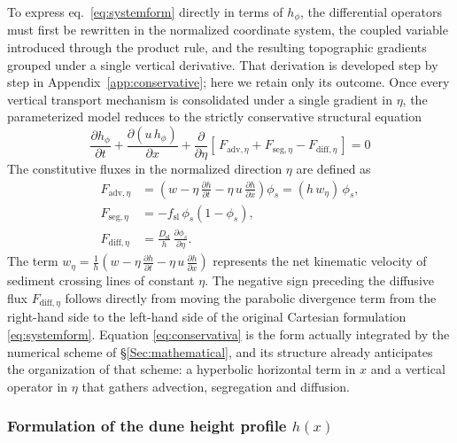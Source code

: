 \documentclass[lineno]{JFM-FLM_Au}
\begin{document}
To express eq.~\eqref{eq:systemform} directly in terms of $h_\phi$, the differential operators must first be rewritten in the normalized coordinate system, the coupled variable introduced through the product rule, and the resulting topographic gradients grouped under a single vertical derivative. That derivation is developed step by step in Appendix~\ref{app:conservative}; here we retain only its outcome. Once every vertical transport mechanism is consolidated under a single gradient in $\eta$, the parameterized model reduces to the strictly conservative structural equation
\begin{equation}
    {\;\frac{\partial h_{\phi}}{\partial t} + \frac{\partial (u \,h_{\phi})}{\partial x} + \frac{\partial}{\partial \eta}\!\left[\, F_{\mathrm{adv},\eta} + F_{\mathrm{seg},\eta} - F_{\mathrm{diff},\eta} \,\right] = 0\;}
    \label{eq:conservativa}
\end{equation}
The constitutive fluxes in the normalized direction $\eta$ are defined as
\begin{align}
    F_{\mathrm{adv},\eta} &= \left( w - \eta \,\frac{\partial h}{\partial t} - \eta \,u \,\frac{\partial h}{\partial x} \right) \!\phi_s = (h \,w_{\eta}) \,\phi_s, \label{eq:Fadv} \\
    F_{\mathrm{seg},\eta} &= -f_{\mathrm{sl}} \,\phi_s (1 - \phi_s), \label{eq:Fseg} \\
    F_{\mathrm{diff},\eta} &= \frac{D_{\mathrm{sl}}}{h} \,\frac{\partial \phi_s}{\partial \eta}. \label{eq:Fdiff}
\end{align}
The term $w_\eta = \frac{1}{h}\left(w - \eta\,\frac{\partial h}{\partial t} - \eta\,u\,\frac{\partial h}{\partial x}\right)$ represents the net kinematic velocity of sediment crossing lines of constant $\eta$. The negative sign preceding the diffusive flux $F_{\mathrm{diff},\eta}$ follows directly from moving the parabolic divergence term from the right-hand side to the left-hand side of the original Cartesian formulation \eqref{eq:systemform}. Equation \eqref{eq:conservativa} is the form actually integrated by the numerical scheme of \S\ref{Sec:mathematical}, and its structure already anticipates the organization of that scheme: a hyperbolic horizontal term in $x$ and a vertical operator in $\eta$ that gathers advection, segregation and diffusion.

\subsubsection{Formulation of the dune height profile $h(x)$}
\label{sec:curvedprofile}
\end{document}
